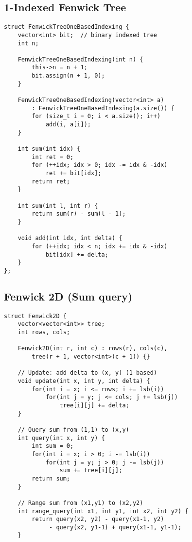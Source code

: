 \documentclass[10pt]{article}
\begin{document}
\begin{multicols*}{2}
\subsection{1-Indexed Fenwick Tree}

\begin{lstlisting}[style=compactcpp]
struct FenwickTreeOneBasedIndexing {
    vector<int> bit;  // binary indexed tree
    int n;

    FenwickTreeOneBasedIndexing(int n) {
        this->n = n + 1;
        bit.assign(n + 1, 0);
    }

    FenwickTreeOneBasedIndexing(vector<int> a)
        : FenwickTreeOneBasedIndexing(a.size()) {
        for (size_t i = 0; i < a.size(); i++)
            add(i, a[i]);
    }

    int sum(int idx) {
        int ret = 0;
        for (++idx; idx > 0; idx -= idx & -idx)
            ret += bit[idx];
        return ret;
    }

    int sum(int l, int r) {
        return sum(r) - sum(l - 1);
    }

    void add(int idx, int delta) {
        for (++idx; idx < n; idx += idx & -idx)
            bit[idx] += delta;
    }
};
\end{lstlisting}

\subsection{Fenwick 2D (Sum query)}
\begin{lstlisting}[style=compactcpp]
struct Fenwick2D {
    vector<vector<int>> tree;
    int rows, cols;
    
    Fenwick2D(int r, int c) : rows(r), cols(c), 
        tree(r + 1, vector<int>(c + 1)) {}
    
    // Update: add delta to (x, y) (1-based)
    void update(int x, int y, int delta) {
        for(int i = x; i <= rows; i += lsb(i))
            for(int j = y; j <= cols; j += lsb(j))
                tree[i][j] += delta;
    }
    
    // Query sum from (1,1) to (x,y)
    int query(int x, int y) {
        int sum = 0;
        for(int i = x; i > 0; i -= lsb(i))
            for(int j = y; j > 0; j -= lsb(j))
                sum += tree[i][j];
        return sum;
    }
    
    // Range sum from (x1,y1) to (x2,y2)
    int range_query(int x1, int y1, int x2, int y2) {
        return query(x2, y2) - query(x1-1, y2) 
             - query(x2, y1-1) + query(x1-1, y1-1);
    }
    

\end{lstlisting}
\end{multicols*}
\end{document}
